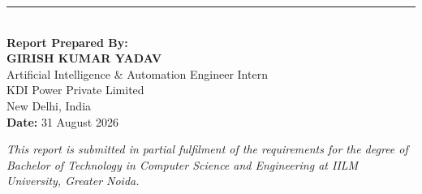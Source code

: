 \documentclass[12pt,a4paper]{report}
\begin{document}
\vspace{2cm}

\begin{center}
\rule{0.5\textwidth}{0.4pt}\\[0.5cm]
\textbf{Report Prepared By:}\\[0.3cm]
\textbf{GIRISH KUMAR YADAV}\\[0.2cm]
Artificial Intelligence \& Automation Engineer Intern\\
KDI Power Private Limited\\
New Delhi, India\\[0.5cm]
\textbf{Date:} 31 August 2026
\end{center}

\vfill

\begin{center}
\textit{This report is submitted in partial fulfilment of the requirements for the degree of Bachelor of Technology in Computer Science and Engineering at IILM University, Greater Noida.}
\end{center}
\end{document}
